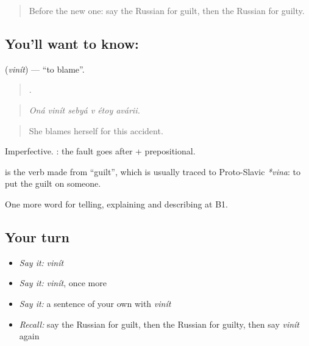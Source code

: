\label{lesson:RU-C352-vinit}



\begin{quote}
Before the new one: say the Russian for guilt, then the Russian for guilty.
\end{quote}

\subsection*{You'll want to know: }
\textbf{} (\emph{vinít}) — \textquotedblleft{}to blame\textquotedblright{}.

\begin{quote}
     .
\end{quote}

\begin{quote}
\emph{Oná vinít sebyá v étoy avárii.}
\end{quote}

\begin{quote}
She blames herself for this accident.
\end{quote}

Imperfective. \emph{   }: the fault goes after \emph{} + prepositional.

\begin{cousinweb}
\textbf{} is the verb made from \emph{} \textquotedblleft{}guilt\textquotedblright{}, which is usually traced to Proto-Slavic \emph{*vina}: to put the guilt on someone.
\end{cousinweb}

\begin{grammarlens}[title={What you've built}]
One more word for telling, explaining and describing at B1.
\end{grammarlens}

\subsection*{Your turn}
\begin{itemize}
\raggedright
  \item \emph{Say it:} \emph{vinít}
  \item \emph{Say it:} \emph{vinít}, once more
  \item \emph{Say it:} a sentence of your own with \emph{vinít}
  \item \emph{Recall:} say the Russian for guilt, then the Russian for guilty, then say \emph{vinít} again
\end{itemize}

